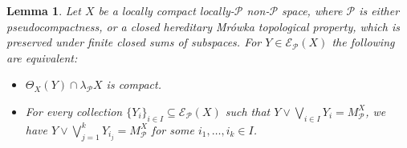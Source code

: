 \documentclass{amsart}
\newtheorem{lemma}[theorem]{Lemma}
\theoremstyle{definition}
\theoremstyle{remark}
\theoremstyle{notation}
\numberwithin{equation}{section}
\begin{document}
\begin{lemma}\label{HGTIITD}
Let $X$  be a locally compact locally-${\mathcal P}$ non-${\mathcal P}$  space,  where  ${\mathcal P}$ is either pseudocompactness, or a
closed hereditary Mr\'{o}wka topological property, which is preserved under  finite closed sums of subspaces.
For $Y\in{\mathscr E}_{{\mathcal P}}(X)$ the following are equivalent:
\begin{itemize}
\item[\rm(1)] $\Theta_X(Y)\cap\lambda_{{\mathcal P}} X$ is compact.
\item[\rm(2)] For every collection $\{Y_i\}_{i\in I}\subseteq{\mathscr E}_{{\mathcal P}}(X)$ such that $Y\vee\bigvee_{i\in I}Y_i=M^X_{{\mathcal P}}$, we have $Y\vee\bigvee_{j=1}^k Y_{i_j}=M^X_{{\mathcal P}}$ for some $i_1,\ldots,i_k\in I$.
\end{itemize}
\end{lemma}
\end{document}
